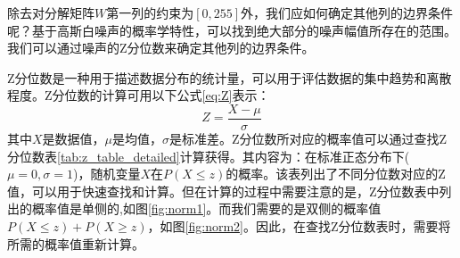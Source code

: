 \documentclass[12pt]{article}
\begin{document}
除去对分解矩阵$W$第一列的约束为$[0,255]$外，我们应如何确定其他列的边界条件呢？基于高斯白噪声的概率学特性，可以找到绝大部分的噪声幅值所存在的范围。我们可以通过噪声的Z分位数来确定其他列的边界条件。

Z分位数是一种用于描述数据分布的统计量，可以用于评估数据的集中趋势和离散程度。Z分位数的计算可用以下公式\ref{eq:Z}表示：
\begin{equation}
    Z = \frac{X - \mu}{\sigma}
    \label{eq:Z}
\end{equation}
其中$X$是数据值，$\mu$是均值，$\sigma$是标准差。Z分位数所对应的概率值可以通过查找Z分位数表\ref{tab:z_table_detailed}计算获得。其内容为：在标准正态分布下($\mu = 0 , \sigma = 1 $)，随机变量$X$在$P(X \leq z)$的概率。该表列出了不同分位数对应的Z值，可以用于快速查找和计算。但在计算的过程中需要注意的是，Z分位数表中列出的概率值是单侧的,如图\ref{fig:norm1}。而我们需要的是双侧的概率值$P(X \leq z) + P(X \geq z)$，如图\ref{fig:norm2}。因此，在查找Z分位数表时，需要将所需的概率值重新计算。
\end{document}
